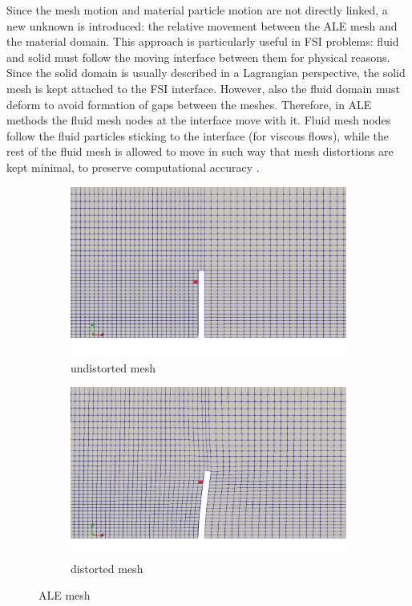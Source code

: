Since the mesh motion and material particle motion are not directly linked, a new unknown is introduced:  the relative movement between the ALE mesh and the material domain. This approach is particularly useful in FSI problems: fluid and solid must follow the moving interface between them for physical reasons.
Since the solid domain is usually described in a Lagrangian perspective, the solid mesh is kept attached to the FSI interface. However, also the fluid domain must deform to avoid formation of gaps between the meshes. Therefore, in ALE methods the fluid mesh nodes at the interface move with it. Fluid mesh nodes follow the fluid particles sticking to the interface (for viscous flows), while the rest of the fluid mesh is allowed to move in such way that mesh distortions are kept minimal, to preserve computational accuracy \cite{ramm1998fluid}.

\begin{figure}[htbp!]
	\centering
	\begin{subfigure}{.5\textwidth}
		\centering
		\includegraphics[width=.99\linewidth]{images/undist}
		\caption{undistorted mesh}
		\label{fig:undist}
	\end{subfigure}%
	\begin{subfigure}{.5\textwidth}
		\centering
		\includegraphics[width=.99\linewidth]{images/dist}
		\caption{distorted mesh}
		\label{fig:dist}
	\end{subfigure}
	\caption{ALE mesh}
	\label{fig:ale-mesh}
\end{figure}

